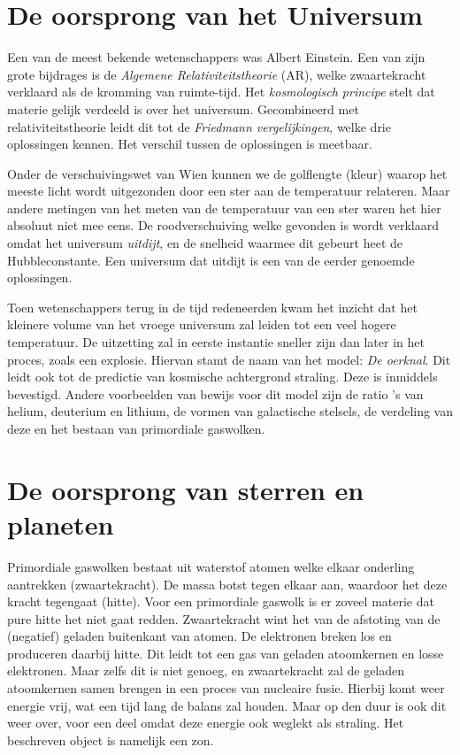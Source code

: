 \documentclass{article}
\begin{document}
    \section{De oorsprong van het Universum}
        Een van de meest bekende wetenschappers was Albert Einstein. Een van zijn grote bijdrages is de \emph{Algemene Relativiteitstheorie} (AR), welke zwaartekracht verklaard als de kromming van ruimte-tijd. Het \emph{kosmologisch principe} stelt dat materie gelijk verdeeld is over het universum. Gecombineerd met relativiteitstheorie leidt dit tot de \emph{Friedmann vergelijkingen}, welke drie oplossingen kennen. Het verschil tussen de oplossingen is meetbaar.
        
        Onder de verschuivingswet van Wien kunnen we de golflengte (kleur) waarop het meeste licht wordt uitgezonden door een ster aan de temperatuur relateren. Maar andere metingen van het meten van de temperatuur van een ster waren het hier absoluut niet mee eens. De roodverschuiving welke gevonden is wordt verklaard omdat het universum \emph{uitdijt}, en de snelheid waarmee dit gebeurt heet de Hubbleconstante. Een universum dat uitdijt is een van de eerder genoemde oplossingen. 
        
        Toen wetenschappers terug in de tijd redeneerden kwam het inzicht dat het kleinere volume van het vroege universum zal leiden tot een veel hogere temperatuur. De uitzetting zal in eerste instantie sneller zijn dan later in het proces, zoals een explosie. Hiervan stamt de naam van het model: \emph{De oerknal}. Dit leidt ook tot de predictie van kosmische achtergrond straling. Deze is inmiddels bevestigd. Andere voorbeelden van bewijs voor dit model zijn de ratio 's van helium, deuterium en lithium, de vormen van galactische stelsels, de verdeling van deze en het bestaan van primordiale gaswolken.
        
    \section{De oorsprong van sterren en planeten}
        Primordiale gaswolken bestaat uit waterstof atomen welke elkaar onderling aantrekken (zwaartekracht). De massa botst tegen elkaar aan, waardoor het deze kracht tegengaat (hitte). Voor een primordiale gaswolk is er zoveel materie dat pure hitte het niet gaat redden. Zwaartekracht wint het van de afstoting van de (negatief) geladen buitenkant van atomen. De elektronen breken los en produceren daarbij hitte. Dit leidt tot een gas van geladen atoomkernen en losse elektronen. Maar zelfs dit is niet genoeg, en zwaartekracht zal de geladen atoomkernen samen brengen in een proces van nucleaire fusie. Hierbij komt weer energie vrij, wat een tijd lang de balans zal houden. Maar op den duur is ook dit weer over, voor een deel omdat deze energie ook weglekt als straling. Het beschreven object is namelijk een zon.
        
\end{document}
